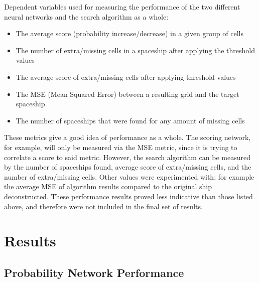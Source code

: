 \documentclass{l4proj}
\begin{document}
Dependent variables used for measuring the performance of the two different neural networks and the search algorithm as a whole:
\begin{itemize}
    \item The average score (probability increase/decrease) in a given group of cells
    \item The number of extra/missing cells in a spaceship after applying the threshold values 
    \item The average score of extra/missing cells after applying threshold values
    \item The MSE (Mean Squared Error) between a resulting grid and the target spaceship 
    \item The number of spaceships that were found for any amount of missing cells
\end{itemize}

These metrics give a good idea of performance as a whole. The scoring network, for example, will only be measured via the MSE metric, since it is trying to correlate a score to said metric. However, the search algorithm can be measured by the number of spaceships found, average score of extra/missing cells, and the number of extra/missing cells. Other values were experimented with; for example the average MSE of algorithm results compared to the original ship deconstructed. These performance results proved less indicative than those listed above, and therefore were not included in the final set of results.

\section{Results}

\subsection{Probability Network Performance}
\end{document}
